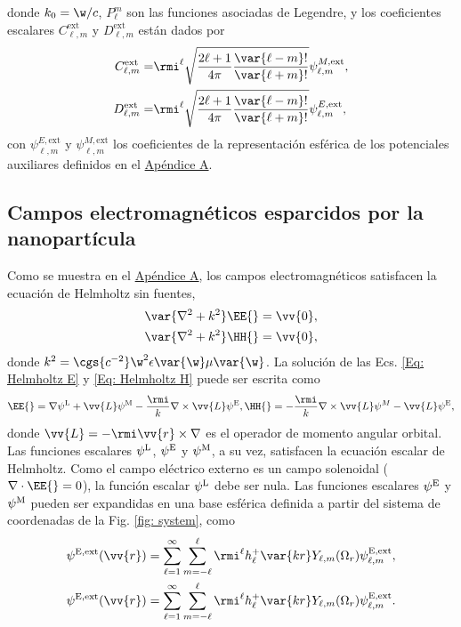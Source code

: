 donde $k_0 = \w /c$, $P_{\ell}^{m}$ son las funciones asociadas de Legendre, y los coeficientes escalares $C_{\ell, m}^{\text{ext}}$ y $D_{\ell, m}^{\text{ext}}$ están dados por 
\begin{align}
C_{\ell, m}^{\text{ext}} =& \rmi^{\ell}\sqrt{\frac{2\ell +1}{4\pi}\frac{\var{\ell - m}!}{\var{\ell +m}!}}\psi_{\ell, m}^{M, \text{ext}},\\
D_{\ell, m}^{\text{ext}} =& \rmi^{\ell}\sqrt{\frac{2\ell +1}{4\pi}\frac{\var{\ell - m}!}{\var{\ell +m}!}}\psi_{\ell, m}^{E, \text{ext}},
\end{align} 
con $\psi_{\ell, m}^{E, \text{ext}}$ y $\psi_{\ell, m}^{M, \text{ext}}$ los coeficientes de la representación esférica de los potenciales auxiliares definidos en el \hyperref[AppendixScalarPotentials]{Apéndice A}.

\subsection{Campos electromagnéticos esparcidos por la nanopartícula}
Como se muestra en el \hyperref[AppendixScalarPotentials]{Apéndice A}, los campos electromagnéticos satisfacen la ecuación de Helmholtz sin fuentes,
\begin{align}
\var{\nabla^2+k^2}\EE{} = \vv{0},\label{Eq: Helmholtz E}\\
\var{\nabla^2+k^2}\HH{} = \vv{0},\label{Eq: Helmholtz H}
\end{align}
donde $k^2 = \cgs{c^{-2}}\w^2\epsilon\var{\w}\mu\var{\w}$. La solución de las Ecs. \eqref{Eq: Helmholtz E} y \eqref{Eq: Helmholtz H} puede ser escrita como \cite{Low}
\begin{align}
\EE{} = \nabla\psi^{\rm L} + \vv{L}\psi^{\rm M}-\frac{\rmi}{k}\nabla\times\vv{L}\psi^{\rm E},
\HH{} = -\frac{\rmi}{k}\nabla\times\vv{L}\psi^{M}-\vv{L}\psi^{\rm E},
\end{align}
donde $\vv{L}=-\rmi \vv{r}\times\nabla$ es el operador de momento angular orbital. Las funciones escalares $\psi^{\rm L}$, $\psi^{\rm E}$ y $\psi^{\rm M}$, a su vez, satisfacen la ecuación escalar de Helmholtz. Como el campo eléctrico externo es un campo solenoidal ($\nabla\cdot\EE{}=0$), la función escalar $\psi^{\rm L}$ debe ser nula. Las funciones escalares $\psi^{\rm E}$ y $\psi^{\rm M}$ pueden ser expandidas en una base esférica definida a partir del sistema de coordenadas de la Fig. \ref{fig: system}, como
\begin{align}
\psi^{\rm E, \text{ext}}(\vv{r})=\sum_{\ell =1}^{\infty}\sum_{m=-\ell}^{\ell}\rmi^{\ell}h_{\ell}^{+}\var{kr}Y_{\ell, m}(\Omega_r)\psi_{\ell, m}^{\rm E, \text{ext}},\\
\psi^{\rm E, \text{ext}}(\vv{r})=\sum_{\ell =1}^{\infty}\sum_{m=-\ell}^{\ell}\rmi^{\ell}h_{\ell}^{+}\var{kr}Y_{\ell, m}(\Omega_r)\psi_{\ell, m}^{\rm E, \text{ext}}.
\end{align}
